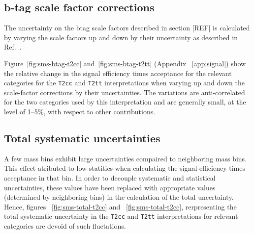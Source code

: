 \subsection{b-tag scale factor corrections\label{sec:sms-syst-btag}}

The uncertainty on the btag scale factors described in section [REF]
is calculated by varying the scale factors up and down by their
uncertainty as described in Ref.~\cite{btagpogtwiki}.

Figure~\ref{fig:sms-btag-t2cc} and~\ref{fig:sms-btag-t2tt} (Appendix ~\ref{app:signal})
show the relative change in the signal efficiency times acceptance for 
the relevant categories for the \verb!T2cc! and \verb!T2tt! interpretations
when varying up and down the scale-factor corrections by their uncertainties. 
The variations  are anti-correlated for the two \nb categories used by this
interpretation and are generally small, at the level of 1--5\%, with
respect to other contributions. 

%
%

\subsection{Total systematic uncertainties\label{sec:total-sms-unc}}

A few mass bins exhibit large uncertainties compaired to neighboring 
mass bins.  This effect atributed to low statitics when calculating the signal
efficiency times acceptance in that bin. In order to decouple systematic
and statistical uncertainties, these values have been replaced with appropriate 
values (determined by neighboring bins) in the calculation of the
total uncertainty. Hence, figures ~\ref{fig:sms-total-t2cc} and
~\ref{fig:sms-total-t2cc}, rerpresenting the total
systematic uncertainty in the \verb!T2cc! and \verb!T2tt! interpretations
for relevant categories are devoid of such fluctations.

